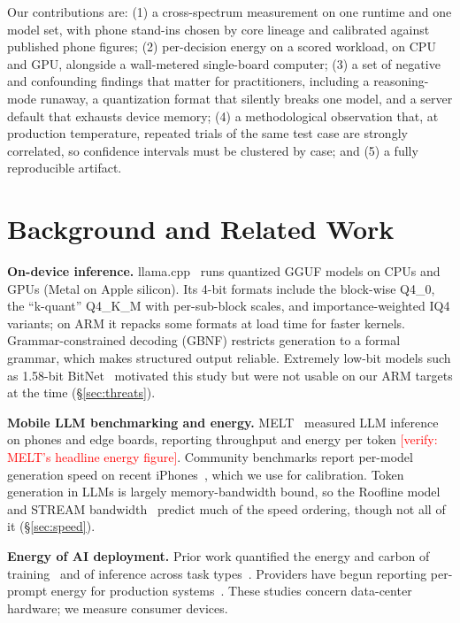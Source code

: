 \documentclass[conference]{IEEEtran}
\newcommand{\verify}[1]{\textcolor{red}{[verify: #1]}}
\begin{document}
Our contributions are: (1) a cross-spectrum measurement on one runtime and one model set, with phone stand-ins chosen by core lineage and calibrated against published phone figures; (2) per-decision energy on a scored workload, on CPU and GPU, alongside a wall-metered single-board computer; (3) a set of negative and confounding findings that matter for practitioners, including a reasoning-mode runaway, a quantization format that silently breaks one model, and a server default that exhausts device memory; (4) a methodological observation that, at production temperature, repeated trials of the same test case are strongly correlated, so confidence intervals must be clustered by case; and (5) a fully reproducible artifact.

\section{Background and Related Work}

\textbf{On-device inference.} llama.cpp~\cite{llamacpp} runs quantized GGUF models on CPUs and GPUs (Metal on Apple silicon). Its 4-bit formats include the block-wise Q4\_0, the ``k-quant'' Q4\_K\_M with per-sub-block scales, and importance-weighted IQ4 variants; on ARM it repacks some formats at load time for faster kernels. Grammar-constrained decoding (GBNF) restricts generation to a formal grammar, which makes structured output reliable. Extremely low-bit models such as 1.58-bit BitNet~\cite{ma2024bitnet} motivated this study but were not usable on our ARM targets at the time (\S\ref{sec:threats}).

\textbf{Mobile LLM benchmarking and energy.} MELT~\cite{laskaridis2024melt} measured LLM inference on phones and edge boards, reporting throughput and energy per token \verify{MELT's headline energy figure}. Community benchmarks report per-model generation speed on recent iPhones~\cite{appleslmbench}, which we use for calibration. Token generation in LLMs is largely memory-bandwidth bound, so the Roofline model~\cite{williams2009roofline} and STREAM bandwidth~\cite{mccalpin1995stream} predict much of the speed ordering, though not all of it (\S\ref{sec:speed}).

\textbf{Energy of AI deployment.} Prior work quantified the energy and carbon of training~\cite{strubell2019energy,patterson2021carbon} and of inference across task types~\cite{luccioni2024power}. Providers have begun reporting per-prompt energy for production systems~\cite{elsworth2025google}. These studies concern data-center hardware; we measure consumer devices.
\end{document}
